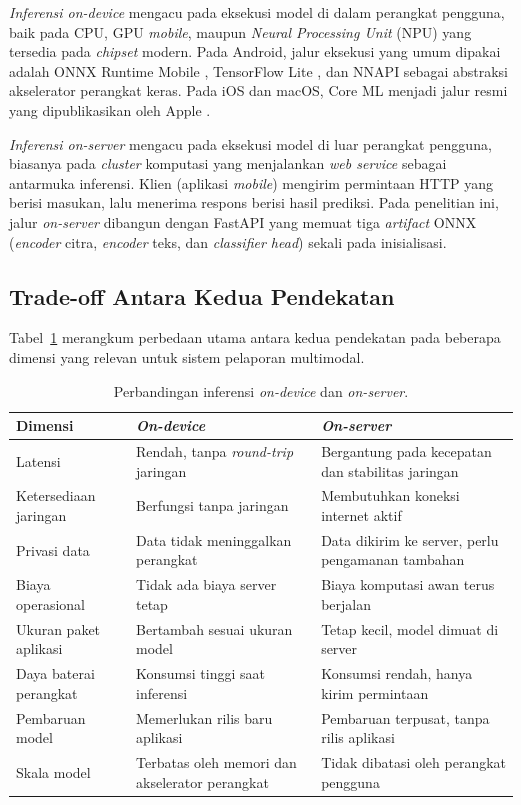 \textit{Inferensi on-device} mengacu pada eksekusi model di dalam perangkat pengguna, baik pada CPU, GPU \textit{mobile}, maupun \textit{Neural Processing Unit} (NPU) yang tersedia pada \textit{chipset} modern. Pada Android, jalur eksekusi yang umum dipakai adalah ONNX Runtime Mobile \citep{onnxruntimeMobileDocs2024}, TensorFlow Lite \citep{tfliteDocs2024}, dan NNAPI sebagai abstraksi akselerator perangkat keras. Pada iOS dan macOS, Core ML menjadi jalur resmi yang dipublikasikan oleh Apple \citep{appleCoreML2024}.

\textit{Inferensi on-server} mengacu pada eksekusi model di luar perangkat pengguna, biasanya pada \textit{cluster} komputasi yang menjalankan \textit{web service} sebagai antarmuka inferensi. Klien (aplikasi \textit{mobile}) mengirim permintaan HTTP yang berisi masukan, lalu menerima respons berisi hasil prediksi. Pada penelitian ini, jalur \textit{on-server} dibangun dengan FastAPI \citep{fastapidoc2024} yang memuat tiga \textit{artifact} ONNX (\textit{encoder} citra, \textit{encoder} teks, dan \textit{classifier head}) sekali pada inisialisasi.

\subsection{Trade-off Antara Kedua Pendekatan}

Tabel~\ref{tab:on-device-vs-on-server} merangkum perbedaan utama antara kedua pendekatan pada beberapa dimensi yang relevan untuk sistem pelaporan multimodal.

\begin{table}[htbp]
\centering
\caption{Perbandingan inferensi \textit{on-device} dan \textit{on-server}.}
\label{tab:on-device-vs-on-server}
\setlength{\tabcolsep}{4pt}
\begin{tabular}{p{3.4cm} p{4.9cm} p{4.9cm}}
\toprule
\textbf{Dimensi} & \textbf{\textit{On-device}} & \textbf{\textit{On-server}} \\
\midrule
Latensi & Rendah, tanpa \textit{round-trip} jaringan & Bergantung pada kecepatan dan stabilitas jaringan \\
Ketersediaan jaringan & Berfungsi tanpa jaringan & Membutuhkan koneksi internet aktif \\
Privasi data & Data tidak meninggalkan perangkat & Data dikirim ke server, perlu pengamanan tambahan \\
Biaya operasional & Tidak ada biaya server tetap & Biaya komputasi awan terus berjalan \\
Ukuran paket aplikasi & Bertambah sesuai ukuran model & Tetap kecil, model dimuat di server \\
Daya baterai perangkat & Konsumsi tinggi saat inferensi & Konsumsi rendah, hanya kirim permintaan \\
Pembaruan model & Memerlukan rilis baru aplikasi & Pembaruan terpusat, tanpa rilis aplikasi \\
Skala model & Terbatas oleh memori dan akselerator perangkat & Tidak dibatasi oleh perangkat pengguna \\
\bottomrule
\end{tabular}
\end{table}

